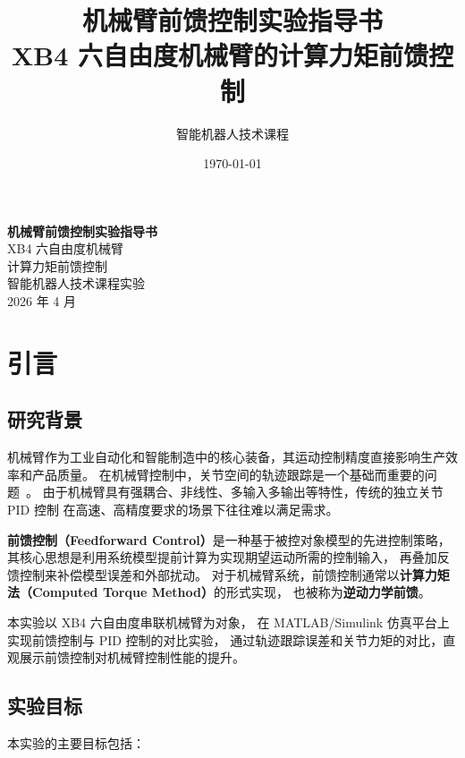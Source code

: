 \documentclass[12pt,a4paper,oneside]{article}
\title{\textbf{\Huge 机械臂前馈控制实验指导书}\\[2em]
    \large XB4 六自由度机械臂的计算力矩前馈控制}
\author{\CJKfamily{hei} 智能机器人技术课程}
\date{\CJKfamily{kai}\large \today}
\numberwithin{equation}{section}
\begin{document}
\begin{titlepage}
    \centering
    \vspace*{2cm}
    {\Huge{}\bfseries 机械臂前馈控制实验指导书}\\[2cm]
    {\LARGE XB4 六自由度机械臂\\计算力矩前馈控制}\\[3cm]
    {\Large{} 智能机器人技术课程实验}\\[2cm]
    {\Large 2026 年 4 月}\\[4cm]
    \thispagestyle{empty}
\end{titlepage}
\thispagestyle{empty}
\newpage

\tableofcontents
\newpage

\pagestyle{fancy}

\section{引言}

\subsection{研究背景}

机械臂作为工业自动化和智能制造中的核心装备，其运动控制精度直接影响生产效率和产品质量。
在机械臂控制中，关节空间的轨迹跟踪是一个基础而重要的问题~\cite{spong2005robot}。
由于机械臂具有强耦合、非线性、多输入多输出等特性，传统的独立关节 PID 控制
在高速、高精度要求的场景下往往难以满足需求。

\textbf{前馈控制（Feedforward Control）}是一种基于被控对象模型的先进控制策略，
其核心思想是利用系统模型提前计算为实现期望运动所需的控制输入，
再叠加反馈控制来补偿模型误差和外部扰动。
对于机械臂系统，前馈控制通常以\textbf{计算力矩法（Computed Torque Method）}的形式实现，
也被称为\textbf{逆动力学前馈}。

本实验以 XB4 六自由度串联机械臂为对象，
在 MATLAB/Simulink 仿真平台上实现前馈控制与 PID 控制的对比实验，
通过轨迹跟踪误差和关节力矩的对比，直观展示前馈控制对机械臂控制性能的提升。

\subsection{实验目标}

本实验的主要目标包括：
\end{document}
